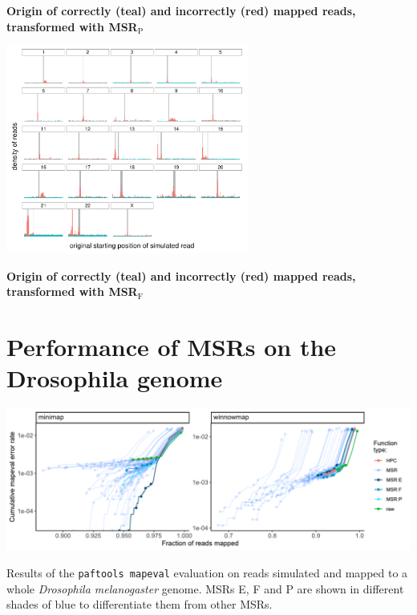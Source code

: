 \documentclass[
  11,
]{scrbook}
\begin{document}
\textbf{Origin of correctly (teal) and incorrectly (red) mapped reads,
transformed with MSR\(_{\text{P}}\)}

\begin{center}
\includegraphics[width=0.6\textwidth]{./figures/HPC-MSRs/msr_f2_distrib.centro.pdf}  
\end{center}

\textbf{Origin of correctly (teal) and incorrectly (red) mapped reads,
transformed with MSR\(_{\text{F}}\)}

\hypertarget{performance-of-msrs-on-the-drosophila-genome}{%
\section{Performance of MSRs on the Drosophila genome}\label{performance-of-msrs-on-the-drosophila-genome}}

\begin{center}
\includegraphics[width=\textwidth]{./figures/HPC-MSRs/drosophila.tweaked.pdf}  
\end{center}

Results of the \texttt{paftools\ mapeval} evaluation on reads simulated and
mapped to a whole \emph{Drosophila melanogaster} genome. MSRs E, F and P are
shown in different shades of blue to differentiate them from other MSRs.

\printbibliography[segment=\therefsegment,heading=subbibintoc,title={References for appendix \thechapter}]

\backmatter
{}

\printbibliography[title=Global References]
\end{document}

